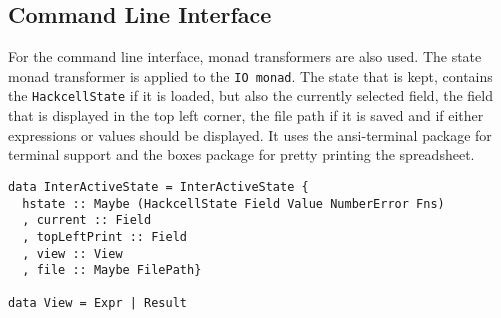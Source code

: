 \documentclass{article}
\begin{document}
	\subsection{Command Line Interface}
	For the command line interface, monad transformers are also used. The state monad transformer is applied to the \texttt{IO monad}. The state that is kept, contains the \texttt{HackcellState} if it is loaded, but also the currently selected field, the field that is displayed in the top left corner, the file path if it is saved and if either expressions or values should be displayed. It uses the ansi-terminal package for terminal support and the boxes package for pretty printing the spreadsheet.
	\begin{verbatim}
data InterActiveState = InterActiveState {
  hstate :: Maybe (HackcellState Field Value NumberError Fns)
  , current :: Field
  , topLeftPrint :: Field
  , view :: View
  , file :: Maybe FilePath}

data View = Expr | Result
	\end{verbatim}
	
	
	
\end{document}

